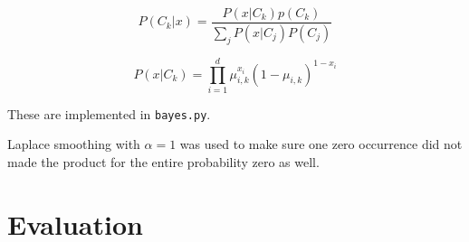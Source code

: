 \documentclass[a4paper,11pt]{article}
\begin{document}
\begin{equation}
P(C_k|x) = \frac{P(x|C_k)p(C_k)}{\sum_j P(x|C_j)P(C_j)}
\label{eq:1}
\end{equation}

\begin{equation}
P(x|C_k)= \prod_{i=1}^d \mu^{x_i}_{i, k}(1 - \mu_{i,k})^{1-x_i}
\label{eq:2}
\end{equation}

These are implemented in \texttt{bayes.py}. 

Laplace smoothing with $\alpha = 1$ was used to make sure one zero occurrence did not made the
product for the entire probability zero as well. 


\section{Evaluation}
\end{document}
